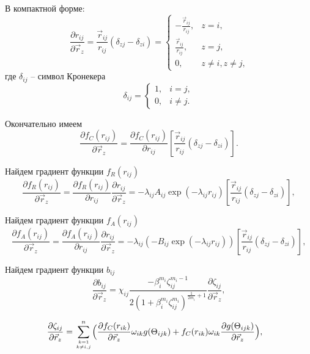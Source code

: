 В компактной форме:
\[
\frac{\partial r_{ij}}{\partial \vec{r}_z} = \frac{\vec {r}_{ij}}{r_{ij}}\left(\delta_{zj} - \delta_{zi}\right) = 
\begin{cases}
-\frac{\vec {r}_{ij}}{r_{ij}}, &\text{$z = i$,}\\
\frac{\vec {r}_{ij}}{r_{ij}}, &\text{$z = j$,}\\
0, &\text{$z \neq i, z \neq j$,}
\end{cases}
\]
где $\delta_{ij}$ -- символ Кронекера
\begin{equation}
\delta_{ij} = \left\{\begin{matrix} 
1, &  i=j,  \\ 
0, &  i \ne j. \end{matrix}\right.
\end{equation}

Окончательно имеем 
\begin{equation}
\frac{\partial f_C(r_{ij})}{\partial \vec{r}_z} =  \frac{\partial f_C(r_{ij})}{\partial r_{ij}} \left[ \frac{\vec {r}_{ij}}{r_{ij}}\left(\delta_{zj} - \delta_{zi}\right)\right].
\end{equation}

Найдем  градиент функции $f_R(r_{ij})$
\begin{equation}
\frac{\partial f_R(r_{ij})}{\partial \vec{r}_z} = \frac{\partial f_R(r_{ij})}{\partial r_{ij}} \frac{\partial r_{ij}}{\partial \vec{r}_z} =  -\lambda_{ij} A_{ij} \exp(-\lambda_{ij}  r_{ij}) \left[ \frac{\vec {r}_{ij}}{r_{ij}}\left(\delta_{zj} - \delta_{zi}\right)\right],
\end{equation}

Найдем  градиент функции $f_A(r_{ij})$
\begin{equation}
\frac{\partial f_A(r_{ij})}{\partial \vec{r}_z} = \frac{\partial f_A(r_{ij})}{\partial r_{ij}} \frac{\partial r_{ij}}{\partial \vec{r}_z} =  -\lambda_{ij} (-B_{ij} \exp(-\lambda_{ij} r_{ij})) \left[ \frac{\vec {r}_{ij}}{r_{ij}}\left(\delta_{zj} - \delta_{zi}\right)\right],
\end{equation}

Найдем градиент функции $b_{ij}$
\begin{equation}
\frac{\partial b_{ij}}{\partial \vec{r}_z} = \chi_{ij} \frac{- \beta_i^{m_i} \zeta^{{m_i}-1}_{ij}}{2(1 + \beta_i^{m_i} \zeta^{m_i}_{ij})^{\frac{1}{2m_i} + 1}} \frac{\partial \zeta_{ij}}{\partial \vec{r}_z},
\end{equation}

\begin{align*}
\frac{\partial \zeta_{ij}}{\partial \vec{r}_z} = \displaystyle\sum_{k=1 \atop k \neq i, j}^{n} & \Big( \frac{\partial f_C(r_{ik})}{\partial \vec{r}_z} \omega_{ik} g(\Theta_{ijk}) + 
f_C(r_{ik}) \omega_{ik} \frac{\partial g(\Theta_{ijk})}{\partial \vec{r}_z} \Big),
\end{align*}

